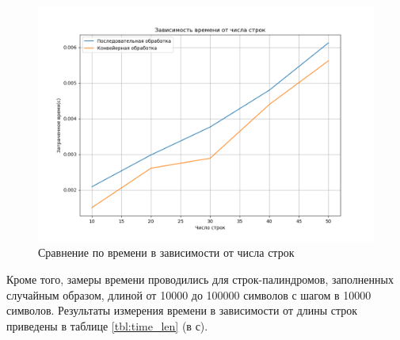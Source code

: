 \begin{figure}[H]
	\begin{center}
		\includegraphics[scale=0.5]{img/count_str.png}
	\end{center}
	\captionsetup{justification=centering}
	\caption{Сравнение по времени в зависимости от числа строк}
	\label{img:count_str}
\end{figure}

Кроме того, замеры времени проводились для строк-палиндромов, заполненных случайным образом, длиной от 10000 до 100000 символов с шагом в 10000 символов. Результаты измерения времени в зависимости от длины строк приведены в таблице \ref{tbl:time_len} (в с).

